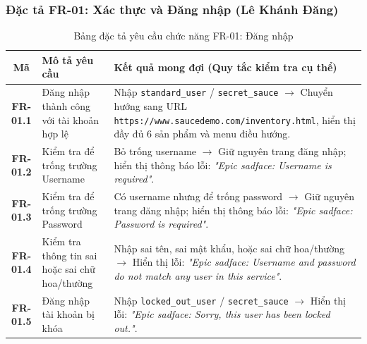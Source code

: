 \documentclass[a4paper]{article}
\begin{document}
\subsubsection{Đặc tả FR-01: Xác thực và Đăng nhập (Lê Khánh Đăng)}
\begin{table}[H]
\centering
\small
\begin{tabularx}{\textwidth}{|c|p{4.5cm}|X|}
\hline
\textbf{Mã} & \textbf{Mô tả yêu cầu} & \textbf{Kết quả mong đợi (Quy tắc kiểm tra cụ thể)} \\ \hline
\textbf{FR-01.1} & Đăng nhập thành công với tài khoản hợp lệ & Nhập \texttt{standard\_user} / \texttt{secret\_sauce} $\rightarrow$ Chuyển hướng sang URL \texttt{https://www.saucedemo.com/inventory.html}, hiển thị đầy đủ 6 sản phẩm và menu điều hướng. \\ \hline
\textbf{FR-01.2} & Kiểm tra để trống trường Username & Bỏ trống username $\rightarrow$ Giữ nguyên trang đăng nhập; hiển thị thông báo lỗi: \textit{"Epic sadface: Username is required"}. \\ \hline
\textbf{FR-01.3} & Kiểm tra để trống trường Password & Có username nhưng để trống password $\rightarrow$ Giữ nguyên trang đăng nhập; hiển thị thông báo lỗi: \textit{"Epic sadface: Password is required"}. \\ \hline
\textbf{FR-01.4} & Kiểm tra thông tin sai hoặc sai chữ hoa/thường & Nhập sai tên, sai mật khẩu, hoặc sai chữ hoa/thường $\rightarrow$ Hiển thị lỗi: \textit{"Epic sadface: Username and password do not match any user in this service"}. \\ \hline
\textbf{FR-01.5} & Đăng nhập tài khoản bị khóa & Nhập \texttt{locked\_out\_user} / \texttt{secret\_sauce} $\rightarrow$ Hiển thị lỗi: \textit{"Epic sadface: Sorry, this user has been locked out."}. \\ \hline
\end{tabularx}
\caption{Bảng đặc tả yêu cầu chức năng FR-01: Đăng nhập}
\end{table}
\end{document}
